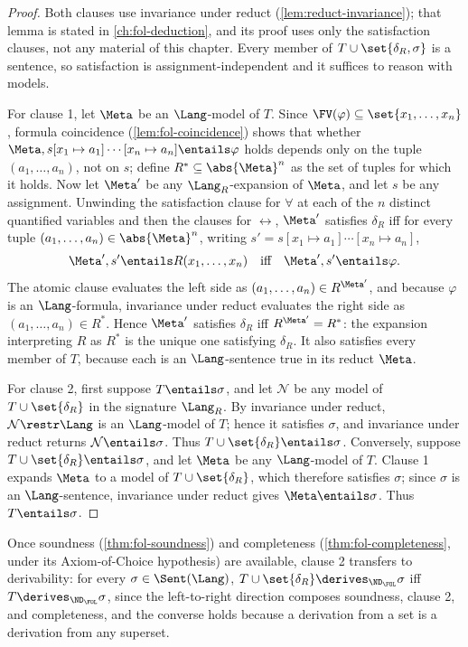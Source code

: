 \begin{proof}
Both clauses use invariance under reduct
(\cref{lem:reduct-invariance}); that lemma is stated in
\cref{ch:fol-deduction}, and its proof uses only the satisfaction clauses,
not any material of this chapter.  Every member of
\(T\cup\set{\delta_R,\sigma}\) is a sentence, so satisfaction is
assignment-independent and it suffices to reason with models.

For clause 1, let \(\Meta\) be an \(\Lang\)-model of \(T\).  Since
\(\FV(\varphi)\subseteq\set{x_1,\ldots,x_n}\), formula coincidence
(\cref{lem:fol-coincidence}) shows that whether
\(\Meta,s[x_1\mapsto a_1]\cdots[x_n\mapsto a_n]\entails\varphi\) holds
depends only on the tuple \((a_1,\ldots,a_n)\), not on \(s\); define
\(R^*\subseteq\abs{\Meta}^n\) as the set of tuples for which it holds.
Now let \(\Meta'\) be any \(\Lang_R\)-expansion of \(\Meta\), and let
\(s\) be any assignment.  Unwinding the satisfaction clause for
\(\forall\) at each of the \(n\) distinct quantified variables and then
the clauses for \(\leftrightarrow\), \(\Meta'\) satisfies \(\delta_R\)
iff for every tuple \((a_1,\ldots,a_n)\in\abs{\Meta}^n\), writing
\(s'=s[x_1\mapsto a_1]\cdots[x_n\mapsto a_n]\),
\[
 \Meta',s'\entails R(x_1,\ldots,x_n)
 \quad\text{iff}\quad
 \Meta',s'\entails\varphi.
\]
The atomic clause evaluates the left side as
\((a_1,\ldots,a_n)\in R^{\Meta'}\), and because \(\varphi\) is an
\(\Lang\)-formula, invariance under reduct evaluates the right side as
\((a_1,\ldots,a_n)\in R^*\).  Hence \(\Meta'\) satisfies \(\delta_R\)
iff \(R^{\Meta'}=R^*\): the expansion interpreting \(R\) as \(R^*\) is
the unique one satisfying \(\delta_R\).  It also satisfies every member
of \(T\), because each is an \(\Lang\)-sentence true in its reduct
\(\Meta\).

For clause 2, first suppose \(T\entails\sigma\), and let \(\mathcal N\)
be any model of \(T\cup\set{\delta_R}\) in the signature \(\Lang_R\).
By invariance under reduct, \(\mathcal N\restr\Lang\) is an
\(\Lang\)-model of \(T\); hence it satisfies \(\sigma\), and invariance
under reduct returns \(\mathcal N\entails\sigma\).  Thus
\(T\cup\set{\delta_R}\entails\sigma\).  Conversely, suppose
\(T\cup\set{\delta_R}\entails\sigma\), and let \(\Meta\) be any
\(\Lang\)-model of \(T\).  Clause 1 expands \(\Meta\) to a model of
\(T\cup\set{\delta_R}\), which therefore satisfies \(\sigma\); since
\(\sigma\) is an \(\Lang\)-sentence, invariance under reduct gives
\(\Meta\entails\sigma\).  Thus \(T\entails\sigma\).
\end{proof}

Once soundness (\cref{thm:fol-soundness}) and completeness
(\cref{thm:fol-completeness}, under its Axiom-of-Choice hypothesis) are
available, clause 2 transfers to derivability: for every
\(\sigma\in\Sent(\Lang)\),
\(T\cup\set{\delta_R}\derives_{\ND_{\FOL}}\sigma\) iff
\(T\derives_{\ND_{\FOL}}\sigma\), since the left-to-right direction
composes soundness, clause 2, and completeness, and the converse holds
because a derivation from a set is a derivation from any superset.


